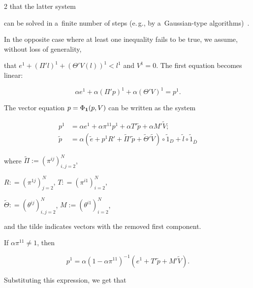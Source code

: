 \begin{multicols}{2}
 that the latter system

can be solved in a~finite number of steps (e.\,g.,  by a~Gaussian-type algorithms)~\cite{kabanov2018clearing}. 





In the opposite case where at least one inequality fails to be true,  we  assume, without loss of generality, 

that  $e^1 + (\Pi' l)^1 + (\Theta' V(l))^1 < l^1$ and $V^1=0$. The first equation  becomes linear:  

\begin{equation*}


\alpha e^1 + \alpha (\Pi' p)^1 + \alpha (\Theta' V)^1 = p^1.

\end{equation*}

 The vector equation $p=\Phi_{\bf 1}(p, V)$ can be written as the system 

\begin{align*}

p^1&=\alpha e^1+ \alpha  \pi^{11}p^1+  \alpha  T' \tilde p +  \alpha  M' \tilde V;\\


\tilde p&=\alpha\left(\tilde e+p^1R'+\tilde \Pi'\tilde p +\tilde \Theta'\tilde V\right)\circ \tilde 1_{D} + \tilde l \circ \tilde 1_{\bar D}

\end{align*}

where $\tilde \Pi := (\pi^{ij})_{i, j = 2}^N$, 

$R: = (\pi^{1j})_{j=2}^N$, $T: = (\pi^{i1})_{i=2}^N$, 

$\tilde \Theta: = (\theta^{ij})_{i, j = 2}^N$, $M := (\theta^{i1})_{i=2}^N$,  

and the tilde indicates  vectors with the removed first component. 



If $\alpha \pi^{11}\neq 1$, then 

\begin{equation*}


p^1 = \alpha(1 - \alpha \pi^{11})^{-1} \left(e^1 +   T' \tilde p +  M' \tilde V\right).

\end{equation*}

Substituting this expression, we get that  


\end{multicols}
